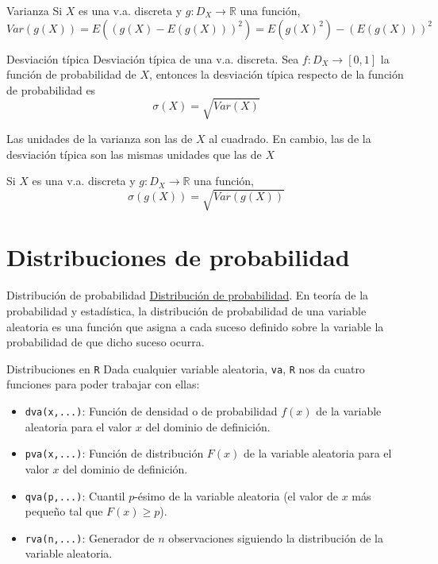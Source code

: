 \documentclass[
  ignorenonframetext,
]{beamer}
\providecommand{\tightlist}{%
  \setlength{\itemsep}{0pt}\setlength{\parskip}{0pt}}
\begin{document}
\begin{frame}{Varianza}
\protect\hypertarget{varianza-1}{}
Si \(X\) es una v.a. discreta y \(g:D_X\longrightarrow \mathbb{R}\) una
función, \[Var(g(X))=E((g(X)-E(g(X)))^2)=E(g(X)^2)-(E(g(X)))^2\]
\end{frame}

\begin{frame}{Desviación típica}
\protect\hypertarget{desviaciuxf3n-tuxedpica}{}
Desviación típica de una v.a. discreta. Sea
\(f:D_X\longrightarrow[0,1]\) la función de probabilidad de \(X\),
entonces la desviación típica respecto de la función de probabilidad es
\[\sigma(X)=\sqrt{Var(X)}\]

Las unidades de la varianza son las de \(X\) al cuadrado. En cambio, las
de la desviación típica son las mismas unidades que las de \(X\)

Si \(X\) es una v.a. discreta y \(g:D_X\longrightarrow \mathbb{R}\) una
función, \[\sigma(g(X))=\sqrt{Var(g(X))}\]
\end{frame}

\hypertarget{distribuciones-de-probabilidad}{%
\section{Distribuciones de
probabilidad}\label{distribuciones-de-probabilidad}}

\begin{frame}{Distribución de probabilidad}
\protect\hypertarget{distribuciuxf3n-de-probabilidad}{}
\href{https://es.wikipedia.org/wiki/Distribución_de_probabilidad}{Distribución
de probabilidad}. En teoría de la probabilidad y estadística, la
distribución de probabilidad de una variable aleatoria es una función
que asigna a cada suceso definido sobre la variable la probabilidad de
que dicho suceso ocurra.
\end{frame}

\begin{frame}[fragile]{Distribuciones en \texttt{R}}
\protect\hypertarget{distribuciones-en-r}{}
Dada cualquier variable aleatoria, \texttt{va}, \texttt{R} nos da cuatro
funciones para poder trabajar con ellas:

\begin{itemize}
\tightlist
\item
  \texttt{dva(x,...)}: Función de densidad o de probabilidad \(f(x)\) de
  la variable aleatoria para el valor \(x\) del dominio de definición.
\item
  \texttt{pva(x,...)}: Función de distribución \(F(x)\) de la variable
  aleatoria para el valor \(x\) del dominio de definición.
\item
  \texttt{qva(p,...)}: Cuantil \(p\)-ésimo de la variable aleatoria (el
  valor de \(x\) más pequeño tal que \(F(x)\geq p\)).
\item
  \texttt{rva(n,...)}: Generador de \(n\) observaciones siguiendo la
  distribución de la variable aleatoria.
\end{itemize}
\end{frame}
\end{document}
